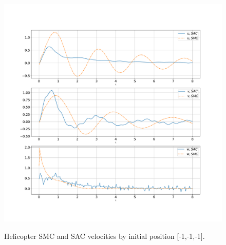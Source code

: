 \begin{figure}
	\begin{center}
		{\includegraphics[scale=0.41]{V.pdf}}
		\caption{Helicopter SMC and SAC velocities by initial position [-1,-1,-1].}
		\label{v_res}
	\end{center}
\end{figure}

